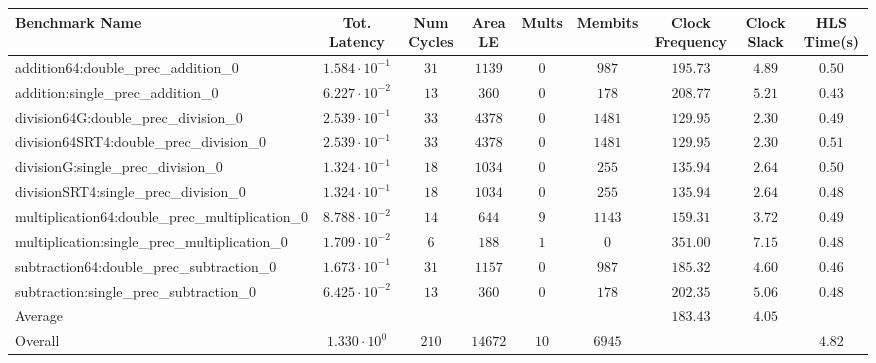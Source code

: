 \begin{tabular}{|l|c|c|c|c|c|c|c|c|}
\hline
Benchmark Name                                   & Tot. Latency            & Num Cycles & Area LE   & Mults  & Membits  & Clock Frequency & Clock Slack & HLS Time(s) \\
\hline
addition64:double\_prec\_addition\_0             & $ 1.584 \cdot 10^{-1} $ & $ 31     $ & $ 1139  $ & $ 0  $ & $ 987  $ & $ 195.73      $ & $ 4.89    $ & $ 0.50    $ \\
addition:single\_prec\_addition\_0               & $ 6.227 \cdot 10^{-2} $ & $ 13     $ & $ 360   $ & $ 0  $ & $ 178  $ & $ 208.77      $ & $ 5.21    $ & $ 0.43    $ \\
division64G:double\_prec\_division\_0            & $ 2.539 \cdot 10^{-1} $ & $ 33     $ & $ 4378  $ & $ 0  $ & $ 1481 $ & $ 129.95      $ & $ 2.30    $ & $ 0.49    $ \\
division64SRT4:double\_prec\_division\_0         & $ 2.539 \cdot 10^{-1} $ & $ 33     $ & $ 4378  $ & $ 0  $ & $ 1481 $ & $ 129.95      $ & $ 2.30    $ & $ 0.51    $ \\
divisionG:single\_prec\_division\_0              & $ 1.324 \cdot 10^{-1} $ & $ 18     $ & $ 1034  $ & $ 0  $ & $ 255  $ & $ 135.94      $ & $ 2.64    $ & $ 0.50    $ \\
divisionSRT4:single\_prec\_division\_0           & $ 1.324 \cdot 10^{-1} $ & $ 18     $ & $ 1034  $ & $ 0  $ & $ 255  $ & $ 135.94      $ & $ 2.64    $ & $ 0.48    $ \\
multiplication64:double\_prec\_multiplication\_0 & $ 8.788 \cdot 10^{-2} $ & $ 14     $ & $ 644   $ & $ 9  $ & $ 1143 $ & $ 159.31      $ & $ 3.72    $ & $ 0.49    $ \\
multiplication:single\_prec\_multiplication\_0   & $ 1.709 \cdot 10^{-2} $ & $ 6      $ & $ 188   $ & $ 1  $ & $ 0    $ & $ 351.00      $ & $ 7.15    $ & $ 0.48    $ \\
subtraction64:double\_prec\_subtraction\_0       & $ 1.673 \cdot 10^{-1} $ & $ 31     $ & $ 1157  $ & $ 0  $ & $ 987  $ & $ 185.32      $ & $ 4.60    $ & $ 0.46    $ \\
subtraction:single\_prec\_subtraction\_0         & $ 6.425 \cdot 10^{-2} $ & $ 13     $ & $ 360   $ & $ 0  $ & $ 178  $ & $ 202.35      $ & $ 5.06    $ & $ 0.48    $ \\
\hline
Average                                          & $                     $ & $        $ & $       $ & $    $ & $      $ & $ 183.43      $ & $ 4.05    $ & $         $ \\
\hline
Overall                                          & $ 1.330 \cdot 10^{0}  $ & $ 210    $ & $ 14672 $ & $ 10 $ & $ 6945 $ & $             $ & $         $ & $ 4.82    $ \\
\hline
\end{tabular}
